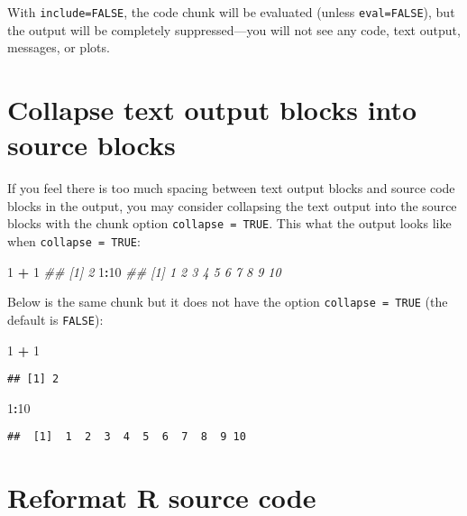 \documentclass[
  11pt,
]{krantz}
\newenvironment{Shaded}{\begin{snugshade}}{\end{snugshade}}
\newcommand{\CommentTok}[1]{\textcolor[rgb]{0.37,0.37,0.37}{\textit{#1}}}
\newcommand{\DecValTok}[1]{\textcolor[rgb]{0.06,0.06,0.06}{#1}}
\newcommand{\OperatorTok}[1]{\textcolor[rgb]{0.43,0.43,0.43}{\textbf{#1}}}
\newcommand{\StringTok}[1]{\textcolor[rgb]{0.5,0.5,0.5}{#1}}
\begin{document}
With \texttt{include=FALSE}, the code chunk will be evaluated (unless \texttt{eval=FALSE}), but the output will be completely suppressed---you will not see any code, text output, messages, or plots.

\hypertarget{opts-collapse}{%
\section{Collapse text output blocks into source blocks}\label{opts-collapse}}

If you feel there is too much spacing between text output blocks and source code blocks in the output, you may consider collapsing the text output into the source blocks with the chunk option \texttt{collapse\ =\ TRUE}. This what the output looks like when \texttt{collapse\ =\ TRUE}:

\begin{Shaded}
\begin{Highlighting}[]
\DecValTok{1} \OperatorTok{+}\StringTok{ }\DecValTok{1}
\CommentTok{## [1] 2}
\DecValTok{1}\OperatorTok{:}\DecValTok{10}
\CommentTok{##  [1]  1  2  3  4  5  6  7  8  9 10}
\end{Highlighting}
\end{Shaded}

Below is the same chunk but it does not have the option \texttt{collapse\ =\ TRUE} (the default is \texttt{FALSE}):

\begin{Shaded}
\begin{Highlighting}[]
\DecValTok{1} \OperatorTok{+}\StringTok{ }\DecValTok{1}
\end{Highlighting}
\end{Shaded}

\begin{verbatim}
## [1] 2
\end{verbatim}

\begin{Shaded}
\begin{Highlighting}[]
\DecValTok{1}\OperatorTok{:}\DecValTok{10}
\end{Highlighting}
\end{Shaded}

\begin{verbatim}
##  [1]  1  2  3  4  5  6  7  8  9 10
\end{verbatim}

\hypertarget{opts-tidy}{%
\section{Reformat R source code}\label{opts-tidy}}
\end{document}
